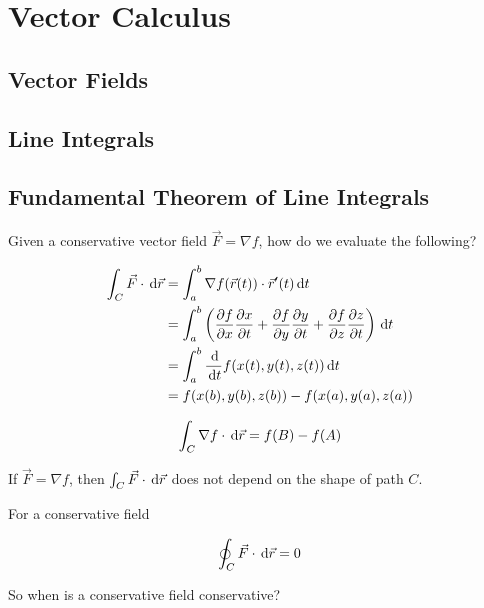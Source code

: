 \chapter{Vector Calculus}

\section{Vector Fields}

\section{Line Integrals}

\section{Fundamental Theorem of Line Integrals}

Given a conservative vector field $\vec F = \nabla f$, how do we evaluate the following?

\begin{align}
	\int_C \vec F \cdot \D \vec r &= \int_a^b \nabla f(\vec r(t)) \cdot \vec r'(t) \D t\\
	&= \int_a^b \left(\frac{\partial f}{\partial x} \frac{\partial x}{\partial t} + \frac{\partial f}{\partial y} \frac{\partial y}{\partial t} + \frac{\partial f}{\partial z} \frac{\partial z}{\partial t}\right) \D t\\
	&= \int_a^b \frac{\D}{\D t} f(x(t), y(t), z(t)) \D t\\
	&= f(x(b), y(b), z(b)) - f(x(a), y(a), z(a))
\end{align}

\begin{theorem}
	\begin{equation}
		\int_C \nabla f \cdot \D \vec r = f(B) - f(A)
	\end{equation}
\end{theorem}

\begin{remark}
	If $\vec F = \nabla f$, then $\int_C \vec F \cdot \D \vec r$ does not depend on the shape of path $C$.
\end{remark}

For a conservative field

\begin{equation}
	\oint_C \vec F \cdot \D \vec r = 0
\end{equation}

So when is a conservative field conservative?

